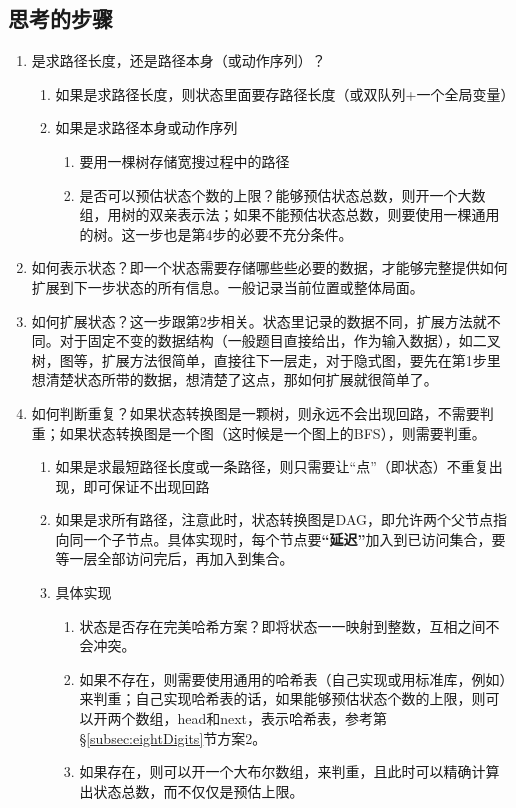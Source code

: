\subsection{思考的步骤}
\begin{enumerate}
\item 是求路径长度，还是路径本身（或动作序列）？
    \begin{enumerate}
    \item 如果是求路径长度，则状态里面要存路径长度（或双队列+一个全局变量）
    \item 如果是求路径本身或动作序列
        \begin{enumerate}
            \item 要用一棵树存储宽搜过程中的路径
            \item 是否可以预估状态个数的上限？能够预估状态总数，则开一个大数组，用树的双亲表示法；如果不能预估状态总数，则要使用一棵通用的树。这一步也是第4步的必要不充分条件。
        \end{enumerate}
    \end{enumerate}

\item 如何表示状态？即一个状态需要存储哪些些必要的数据，才能够完整提供如何扩展到下一步状态的所有信息。一般记录当前位置或整体局面。

\item 如何扩展状态？这一步跟第2步相关。状态里记录的数据不同，扩展方法就不同。对于固定不变的数据结构（一般题目直接给出，作为输入数据），如二叉树，图等，扩展方法很简单，直接往下一层走，对于隐式图，要先在第1步里想清楚状态所带的数据，想清楚了这点，那如何扩展就很简单了。

\item 如何判断重复？如果状态转换图是一颗树，则永远不会出现回路，不需要判重；如果状态转换图是一个图（这时候是一个图上的BFS），则需要判重。
    \begin{enumerate}
    \item 如果是求最短路径长度或一条路径，则只需要让“点”（即状态）不重复出现，即可保证不出现回路
    \item 如果是求所有路径，注意此时，状态转换图是DAG，即允许两个父节点指向同一个子节点。具体实现时，每个节点要\textbf{“延迟”}加入到已访问集合，要等一层全部访问完后，再加入到集合。
    \item 具体实现
        \begin{enumerate}
        \item 状态是否存在完美哈希方案？即将状态一一映射到整数，互相之间不会冲突。
        \item 如果不存在，则需要使用通用的哈希表（自己实现或用标准库，例如）来判重；自己实现哈希表的话，如果能够预估状态个数的上限，则可以开两个数组，head和next，表示哈希表，参考第 \S \ref{subsec:eightDigits}节方案2。
        \item 如果存在，则可以开一个大布尔数组，来判重，且此时可以精确计算出状态总数，而不仅仅是预估上限。
        \end{enumerate}
    \end{enumerate}


\end{enumerate}
